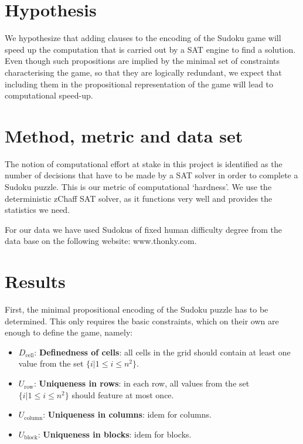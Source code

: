\documentclass[10pt,a4paper,leqno]{article}
\newcommand{\dcell}{D_{\text{cell}}}
\newcommand{\urow}{U_{\text{row}}}
\newcommand{\ucol}{U_{\text{column}}}
\newcommand{\ublock}{U_{\text{block}}}
\begin{document}
\section*{Hypothesis}

We hypothesize that adding clauses to the encoding of the Sudoku game will speed up the computation that is carried out by a SAT engine to find a solution. Even though such propositions are implied by the minimal set of constraints characterising the game, so that they are logically redundant, we expect that including them in the propositional representation of the game will lead to computational speed-up. 

\section*{Method, metric and data set}

The notion of computational effort at stake in this project is identified as the number of decisions that have to be made by a SAT solver in order to complete a Sudoku puzzle. This is our metric of computational `hardness'. We use the deterministic zChaff SAT solver, as it functions very well and provides the statistics we need. 

For our data we have used Sudokus of fixed human difficulty degree from the data base on the following website: www.thonky.com. 


\section*{Results}

First, the minimal propositional encoding of the Sudoku puzzle has to be determined. This only requires the basic constraints, which on their own are enough to define the game, namely:

\begin{itemize}

\item $\dcell$: \textbf{Definedness of cells}: all cells in the grid should contain at least one value from the set $\{i | 1 \leq i \leq n^2\}$.

\item $\urow$: \textbf{Uniqueness in rows}: in each row, all values from the set $\{i | 1 \leq i \leq n^2\}$ should feature at most once. 

\item $\ucol$: \textbf{Uniqueness in columns}: idem for columns. 

\item $\ublock$: \textbf{Uniqueness in blocks}: idem for blocks. 

\end{itemize}
\end{document}
